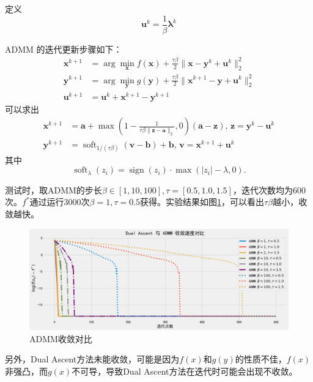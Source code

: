 \documentclass{homework}
\begin{document}
\begin{sol}
 定义
    \[
    \mathbf{u}^k = \frac{1}{\beta} \boldsymbol{\lambda}^k
    \]
    
    ADMM 的迭代更新步骤如下：
    \[
    \begin{aligned}
    \mathbf{x}^{k+1} &= \arg\min_{\mathbf{x}} f(\mathbf{x}) + \frac{\tau \beta}{2} \|\mathbf{x} - \mathbf{y}^k + \mathbf{u}^k\|_2^2 \\
    \mathbf{y}^{k+1} &= \arg\min_{\mathbf{y}} g(\mathbf{y}) + \frac{\tau \beta}{2} \|\mathbf{x}^{k+1} - \mathbf{y} + \mathbf{u}^k\|_2^2 \\
    \mathbf{u}^{k+1} &= \mathbf{u}^k + \mathbf{x}^{k+1} - \mathbf{y}^{k+1}
    \end{aligned}
    \]
    可以求出
    \[
\begin{aligned}
\mathbf{x}^{k+1} &= \mathbf{a} + \max\left(1 - \frac{1}{\tau\beta \|\mathbf{z} - \mathbf{a}\|_2}, 0\right) (\mathbf{a} - \mathbf{z}),\, \mathbf{z}= \mathbf{y}^k - \mathbf{u}^k\\
\mathbf{y}^{k+1} &= \operatorname{soft}_{1/(\tau\beta)}(\mathbf{v} - \mathbf{b}) + \mathbf{b},\,\mathbf{v} = \mathbf{x}^{k+1} + \mathbf{u}^k
\end{aligned}\]
其中
\[
\operatorname{soft}_\lambda(z_i) = \operatorname{sign}(z_i) \cdot \max(|z_i| - \lambda, 0).
\]

测试时，取ADMM的步长$\beta \in [1, 10, 100],\tau = [0.5, 1.0, 1.5]$，迭代次数均为$600$次。$f^*$通过运行3000次$\beta = 1,\tau = 0.5$获得。实验结果如图\ref{2}，可以看出$\tau\beta$越小，收敛越快。
\begin{figure}[h]
    \centering
        \centering
        \includegraphics[width=0.8\linewidth]{3.png}
        \caption{ADMM收敛对比}\label{2}
\end{figure}

另外，Dual Ascent方法未能收敛，可能是因为$f(x)$和$g(y)$的性质不佳，$f(x)$非强凸，而$g(x)$不可导，导致Dual Ascent方法在迭代时可能会出现不收敛。

\end{sol}

\question
\end{document}
